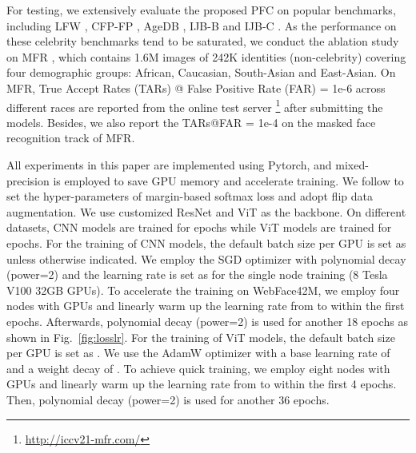 \documentclass[10pt,twocolumn,letterpaper]{article}
\begin{document}
For testing, we extensively evaluate the proposed PFC on popular benchmarks, including LFW \cite{huang2007labeled}, CFP-FP \cite{sengupta2016frontal}, AgeDB \cite{Moschoglou2017AgeDB}, IJB-B \cite{whitelam2017iarpa} and IJB-C \cite{maze2018iarpa}. As the performance on these celebrity benchmarks tend to be saturated, we conduct the ablation study on MFR \cite{deng2021mfrinsightface}, which contains 1.6M images of 242K identities (non-celebrity) covering four demographic groups: African, Caucasian, South-Asian and East-Asian. On MFR, True Accept Rates (TARs) @ False Positive Rate (FAR) = 1e-6 across different races are reported from the online test server \footnote{\url{http://iccv21-mfr.com/}} after submitting the models. Besides, we also report the TARs@FAR = 1e-4 on the masked face recognition track of MFR.

All experiments in this paper are implemented using Pytorch, and mixed-precision \cite{Micikevicius2018MixedPT} is employed to save GPU memory and accelerate training. We follow \cite{deng2019arcface,tencent2018CosineFace} to set the hyper-parameters of margin-based softmax loss and adopt flip data augmentation. We use customized ResNet \cite{he2016deep,deng2019arcface} and ViT \cite{dosovitskiy2020image} as the backbone. On different datasets, CNN models are trained for  epochs while ViT models are trained for  epochs.
For the training of CNN models, the default batch size per GPU is set as  unless otherwise indicated. We employ the SGD optimizer with polynomial decay (power=2) and the learning rate is set as  for the single node training (8 Tesla V100 32GB GPUs). To accelerate the training on WebFace42M, we employ four nodes with  GPUs and linearly warm up the learning rate from  to  within the first  epochs. Afterwards, polynomial decay (power=2) is used for another 18 epochs as shown in Fig.~\ref{fig:losslr}.
For the training of ViT models, the default batch size per GPU is set as . We use the AdamW \cite{loshchilov2017decoupled} optimizer with a base learning rate of  and a weight decay of . To achieve quick training, we employ eight nodes with  GPUs and linearly warm up the learning rate from  to  within the first 4 epochs. Then, polynomial decay (power=2) is used for another 36 epochs.  
\end{document}
